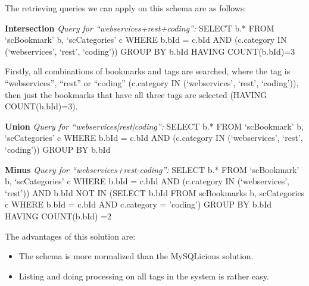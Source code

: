The retrieving queries we can apply on this schema are as follows:

\textbf{Intersection}\newline
\textit{Query for ``webservices+rest+coding'':}\newline\newline
SELECT b.*\newline
FROM `scBookmark' b, `scCategories' c\newline
WHERE b.bId = c.bId\newline
AND (c.category IN (`webservices', `rest', `coding'))\newline
GROUP BY b.bId\newline
HAVING COUNT(b.bId)=3

Firstly, all combinations of bookmarks and tags are searched, where the tag is ``webservices'', ``rest'' or ``coding'' (c.category IN (`webservices', `rest', `coding')), then just the bookmarks that have all three tags are selected (HAVING COUNT(b.bId)=3).

\textbf{Union}\newline
\textit{Query for ``webservices|rest|coding'':}\newline\newline
SELECT b.*\newline
FROM `scBookmark' b, `scCategories' c\newline
WHERE b.bId = c.bId\newline
AND (c.category IN (`webservices', `rest', `coding'))\newline
GROUP BY b.bId

\textbf{Minus}\newline
\textit{Query for ``webservices+rest-coding'':}\newline\newline
SELECT b.*\newline
FROM `scBookmark' b, `scCategories' c\newline
WHERE b.bId = c.bId\newline
AND (c.category IN (`webservices', `rest'))\newline
AND b.bId NOT\newline
IN (SELECT b.bId FROM scBookmarks b, scCategories c WHERE b.bId = c.bId AND c.category = 'coding')\newline
GROUP BY b.bId\newline
HAVING COUNT(b.bId) =2

The advantages of this solution are:
\begin{itemize}
   \item The schema is more normalized than the MySQLicious solution.
   \item Listing and doing processing on all tags in the system is rather easy.
\end{itemize}


